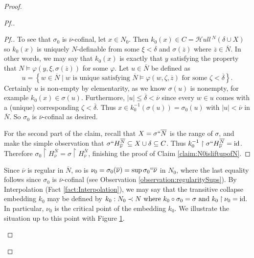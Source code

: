 \documentclass{amsart}
\theoremstyle{definition}
\theoremstyle{remark}
\newcommand{\N}{{\overline{N}}}
\newcommand{\id}{\textup{\ensuremath{\text{id}}}}
\newcommand{\st}{\; | \;}
\newcommand{\set}[2]{\left\{#1\st #2 \right\}}
\newcommand{\rest}{\mathbin{\upharpoonright}}
\newcommand{\SH}{\mathcal{H}\textit{ull} \,}
\newcommand{\Sk}[3]{\SH^{#1}( {#2} \cup {#3} ) }
\begin{document}
\begin{proof}
\begin{proof}[Pf.]
\begin{proof}[Pf.]
To see that $\sigma_0$ is $\overline \nu$-cofinal, let $x \in N_0$. Then $k_0(x) \in C = \Sk{N}{\delta}{X}$ so $k_0(x)$ is uniquely $N$-definable from some $\xi < \delta$ and $\sigma(\overline z)$ where $\overline z \in \N$. In other words, we may say that $k_0(x)$ is exactly that  $y$ satisfying the property that $N \models \varphi(y, \xi, \sigma(\overline z))$ for some $\varphi$. Let $u \in \N$ be defined as 
	$$u=\set{ w \in \N }{\text{$w$ is unique satisfying $\N \models \varphi(w, \zeta, \overline z)$ for some $\zeta < \overline \delta$}}.$$
Certainly $u$ is non-empty by elementarity, as we know $\sigma(u)$ is nonempty, for example $k_0(x) \in \sigma(u)$.
Furthermore, $|u| \leq \overline \delta < \overline \nu$ since every $w \in u$ comes with a (unique) corresponding $\zeta<\overline \delta$.
Thus $x \in k_0^{-1}(\sigma(u))=\sigma_0(u)$ with $|u| < \overline \nu$ in $\N$. So $\sigma_0$ is $\overline \nu$-cofinal as desired. 

For the second part of the claim, recall that $X=\sigma``\N$ is the range of $\sigma$, and make the simple observation that $\sigma``H_{\overline \nu}^{\N} \subseteq X \cup \delta \subseteq C$. Thus $k_0^{-1} \upharpoonright \sigma``H_{\overline \nu}^{\overline N} = \text{id}$.
Therefore $\sigma_0 \rest H_{\overline \nu}^{\N}=\sigma \rest H_{\overline \nu}^{\overline N}$, finishing the proof of Claim \ref{claim:N0isliftupofN}.
\end{proof}

Since $\overline \nu$ is regular in $\N$, so is $\nu_0=\sigma_0(\overline \nu)=\sup \sigma_0``\overline \nu$ in $N_0$, where the last equality follows since $\sigma_0$ is $\overline \nu$-cofinal (see Observation \ref{observation:regularitySups}).
By Interpolation (Fact \ref{fact:Interpolation}), we may say that the transitive collapse embedding $k_0$ may be defined by 
	$k_0: N_0 \prec N \text{ where } k_0 \circ \sigma_0=\sigma \text{ and } k_0 \rest \nu_0 = \id.$
In particular, $\nu_0$ is the critical point of the embedding $k_0$. We illustrate the situation up to this point with Figure \ref{figure:N0N}. 

\begin{figure}[h!] \label{figure:N0N}
\end{figure}
\end{proof}
\end{proof}
\end{document}
